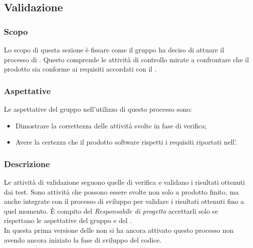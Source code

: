 \subsection{Validazione}
\subsubsection{Scopo}
Lo scopo di questa sezione è fissare come il gruppo ha deciso di attuare il processo di . Questo comprende le attività di controllo mirate a confrontare che il prodotto sia conforme ai requisiti accordati con il .

\subsubsection{Aspettative}
Le aspettative del gruppo \Gruppo{} nell'utilizzo di questo processo sono:
\begin{itemize}
	\item Dimostrare la correttezza delle attività svolte in fase di verifica; 
	\item Avere la certezza che il prodotto software rispetti i requisiti riportati nell'\AdRv.
\end{itemize}

\subsubsection{Descrizione}
Le attività di validazione seguono quelle di verifica e validano i risultati ottenuti dai test. Sono attività che possono essere svolte non solo a prodotto finito, ma anche integrate con il processo di sviluppo per validare i risultati ottenuti fino a quel momento. È compito del \textit{Responsabile di progetto} accettarli solo se rispettano le aspettative del gruppo e del . \\
\linebreak
In questa prima versione delle \NdPv non si ha ancora attivato questo processo non avendo ancora iniziato la fase di sviluppo del codice.

